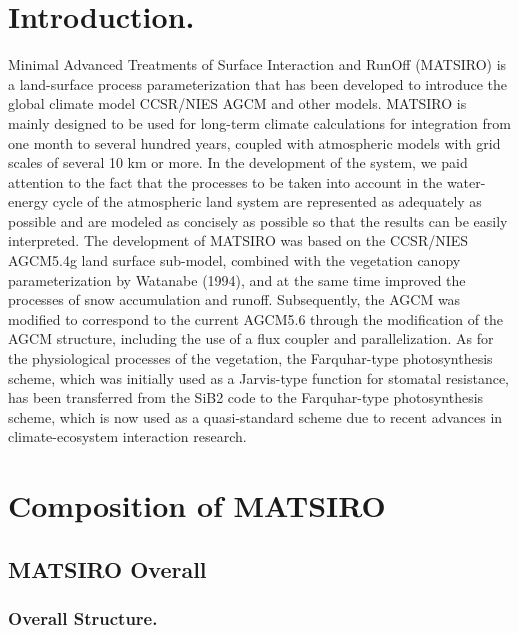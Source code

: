 \hypertarget{introduction.}{%
\section{Introduction.}\label{introduction.}}

Minimal Advanced Treatments of Surface Interaction and RunOff (MATSIRO)
is a land-surface process parameterization that has been developed to
introduce the global climate model CCSR/NIES AGCM and other models.
MATSIRO is mainly designed to be used for long-term climate calculations
for integration from one month to several hundred years, coupled with
atmospheric models with grid scales of several 10 km or more. In the
development of the system, we paid attention to the fact that the
processes to be taken into account in the water-energy cycle of the
atmospheric land system are represented as adequately as possible and
are modeled as concisely as possible so that the results can be easily
interpreted. The development of MATSIRO was based on the CCSR/NIES
AGCM5.4g land surface sub-model, combined with the vegetation canopy
parameterization by Watanabe (1994), and at the same time improved the
processes of snow accumulation and runoff. Subsequently, the AGCM was
modified to correspond to the current AGCM5.6 through the modification
of the AGCM structure, including the use of a flux coupler and
parallelization. As for the physiological processes of the vegetation,
the Farquhar-type photosynthesis scheme, which was initially used as a
Jarvis-type function for stomatal resistance, has been transferred from
the SiB2 code to the Farquhar-type photosynthesis scheme, which is now
used as a quasi-standard scheme due to recent advances in
climate-ecosystem interaction research.

\hypertarget{composition-of-matsiro}{%
\section{Composition of MATSIRO}\label{composition-of-matsiro}}

\hypertarget{matsiro-overall}{%
\subsection{MATSIRO Overall}\label{matsiro-overall}}

\hypertarget{overall-structure.}{%
\subsubsection{Overall Structure.}\label{overall-structure.}}

